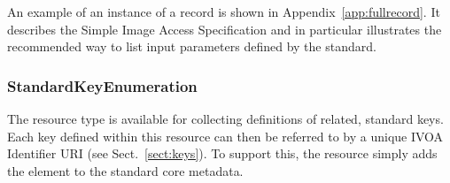 \documentclass[11pt,a4paper]{ivoa}
\begin{document}
An example of an instance of a 
record is shown in Appendix~\ref{app:fullrecord}.  It describes the
Simple Image Access Specification and
in particular illustrates the recommended way to list input parameters
defined by the standard.



\subsubsection{StandardKeyEnumeration}

The  resource type is available
for collecting definitions of related, standard keys.  Each key defined
within this resource can then be referred to by a unique IVOA
Identifier URI (see Sect.~\ref{sect:keys}).  To support
this, the  resource simply
adds the  element to the standard core
metadata.
\end{document}
